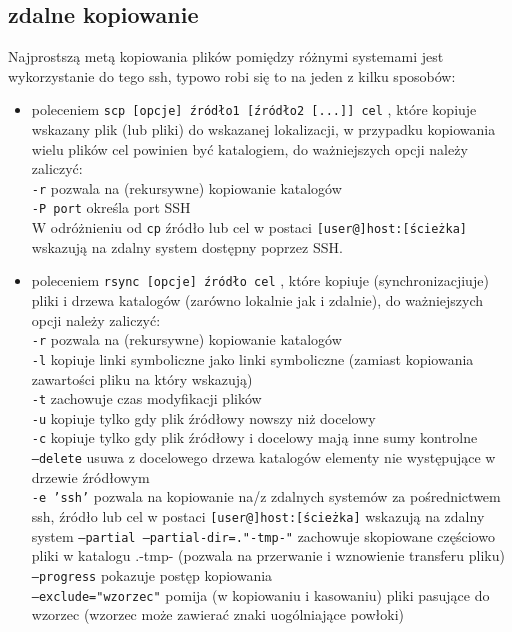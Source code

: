 \subsection{zdalne kopiowanie}
Najprostszą metą kopiowania plików pomiędzy różnymi systemami jest wykorzystanie do tego ssh, typowo robi się to na jeden z kilku sposobów:
\begin{itemize}
	\item poleceniem
		\texttt{scp [opcje] źródło1 [źródło2 [...]] cel}
		, które
		kopiuje wskazany plik (lub pliki) do wskazanej lokalizacji, w przypadku kopiowania wielu plików cel powinien być katalogiem, do ważniejszych opcji należy zaliczyć:\\
		\texttt{-r} pozwala na (rekursywne) kopiowanie katalogów\\
		\texttt{-P port} określa port SSH\\
		W odróżnieniu od \texttt{cp} źródło lub cel w postaci \texttt{[user@]host:[ścieżka]} wskazują na zdalny system dostępny poprzez SSH.
	\item poleceniem
		\texttt{rsync [opcje] źródło cel}
		, które
		kopiuje (synchronizacjiuje) pliki i drzewa katalogów (zarówno lokalnie jak i zdalnie), do ważniejszych opcji należy zaliczyć:\\
			\texttt{-r} pozwala na (rekursywne) kopiowanie katalogów\\
			\texttt{-l} kopiuje linki symboliczne jako linki symboliczne (zamiast kopiowania zawartości pliku na który wskazują)\\
			\texttt{-t} zachowuje czas modyfikacji plików\\
			\texttt{-u} kopiuje tylko gdy plik źródłowy nowszy niż docelowy\\
			\texttt{-c} kopiuje tylko gdy plik źródłowy i docelowy mają inne sumy kontrolne\\
			\texttt{--delete} usuwa z docelowego drzewa katalogów elementy nie występujące w drzewie źródłowym\vspace{6pt}\\
			\texttt{-e 'ssh'} pozwala na kopiowanie na/z zdalnych systemów za pośrednictwem ssh, źródło lub cel w postaci \texttt{[user@]host:[ścieżka]} wskazują na zdalny system
			\texttt{--partial --partial-dir=."-tmp-"} zachowuje skopiowane częściowo pliki w katalogu .-tmp- (pozwala na przerwanie i wznowienie transferu pliku)\\
			\texttt{--progress} pokazuje postęp kopiowania\\
			\texttt{--exclude="wzorzec"} pomija (w kopiowaniu i kasowaniu) pliki pasujące do wzorzec (wzorzec może zawierać znaki uogólniające powłoki)

\end{itemize}
